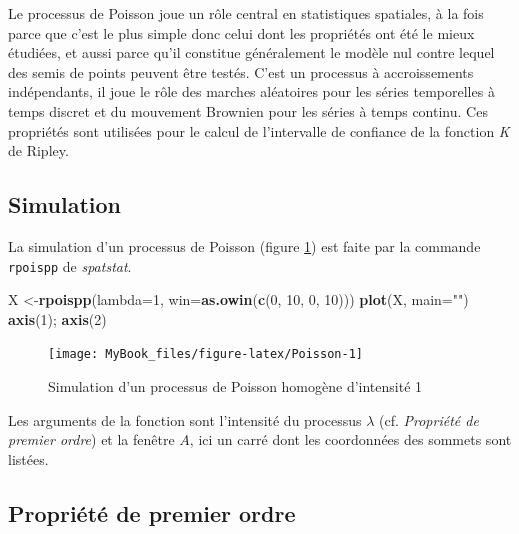 \documentclass[
  11pt,
  french,
  A4paper,
  extrafontsizes,onecolumn,openright
  ]{memoir}
\newenvironment{Shaded}{\begin{snugshade}}{\end{snugshade}}
\newcommand{\KeywordTok}[1]{\textcolor[rgb]{0.13,0.29,0.53}{\textbf{#1}}}
\newcommand{\DataTypeTok}[1]{\textcolor[rgb]{0.13,0.29,0.53}{#1}}
\newcommand{\DecValTok}[1]{\textcolor[rgb]{0.00,0.00,0.81}{#1}}
\newcommand{\StringTok}[1]{\textcolor[rgb]{0.31,0.60,0.02}{#1}}
\newcommand{\NormalTok}[1]{#1}
\theoremstyle{definition}
\theoremstyle{definition}
\theoremstyle{definition}
\theoremstyle{remark}
\begin{document}
Le processus de Poisson joue un rôle central en statistiques spatiales,
à la fois parce que c'est le plus simple donc celui dont les propriétés
ont été le mieux étudiées, et aussi parce qu'il constitue généralement
le modèle nul contre lequel des semis de points peuvent être testés.
C'est un processus à accroissements indépendants, il joue le rôle des
marches aléatoires pour les séries temporelles à temps discret et du
mouvement Brownien pour les séries à temps continu. Ces propriétés sont
utilisées pour le calcul de l'intervalle de confiance de la fonction
\emph{K} de Ripley.

\subsection{Simulation}\label{simulation}

La simulation d'un processus de Poisson (figure \ref{fig:Poisson}) est
faite par la commande \texttt{rpoispp} de \emph{spatstat}.

\begin{Shaded}
\begin{Highlighting}[]
\NormalTok{X <-}\KeywordTok{rpoispp}\NormalTok{(}\DataTypeTok{lambda=}\DecValTok{1}\NormalTok{, }\DataTypeTok{win=}\KeywordTok{as.owin}\NormalTok{(}\KeywordTok{c}\NormalTok{(}\DecValTok{0}\NormalTok{, }\DecValTok{10}\NormalTok{, }\DecValTok{0}\NormalTok{, }\DecValTok{10}\NormalTok{)))}
\KeywordTok{plot}\NormalTok{(X, }\DataTypeTok{main=}\StringTok{""}\NormalTok{)}
\KeywordTok{axis}\NormalTok{(}\DecValTok{1}\NormalTok{); }\KeywordTok{axis}\NormalTok{(}\DecValTok{2}\NormalTok{)}
\end{Highlighting}
\end{Shaded}

\begin{figure}

{\centering \texttt{[image: MyBook\_files/figure-latex/Poisson-1]} 

}

\caption{Simulation d’un processus de Poisson homogène d’intensité 1}\label{fig:Poisson}
\end{figure}

Les arguments de la fonction sont l'intensité du processus \(\lambda\)
(cf. \emph{Propriété de premier ordre}) et la fenêtre \(A\), ici un
carré dont les coordonnées des sommets sont listées.

\subsection{Propriété de premier
ordre}\label{propriete-de-premier-ordre-1}
\end{document}
